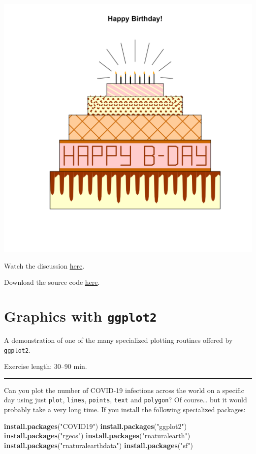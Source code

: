 \documentclass[
]{book}
\newenvironment{Shaded}{\begin{snugshade}}{\end{snugshade}}
\newcommand{\FunctionTok}[1]{\textcolor[rgb]{0.13,0.29,0.53}{\textbf{#1}}}
\newcommand{\NormalTok}[1]{#1}
\newcommand{\StringTok}[1]{\textcolor[rgb]{0.31,0.60,0.02}{#1}}
\begin{document}
\includegraphics[width=28in]{figures/AS2022cake}

Watch the discussion \href{https://youtu.be/ERXp51uHp2w}{here}.

Download the source code \href{files/cake-winner-AS-2021.Rmd}{here}.

\hypertarget{ggplot2}{%
\chapter{\texorpdfstring{Graphics with \texttt{ggplot2}}{Graphics with ggplot2}}\label{ggplot2}}

A demonstration of one of the many specialized plotting routines offered by \texttt{ggplot2}.

Exercise length: 30--90 min.

\begin{center}\rule{0.5\linewidth}{0.5pt}\end{center}

Can you plot the number of COVID-19 infections across the world on a specific day using just \texttt{plot}, \texttt{lines}, \texttt{points}, \texttt{text} and \texttt{polygon}? Of course\ldots{} but it would probably take a very long time. If you install the following specialized packages:

\begin{Shaded}
\begin{Highlighting}[]
\FunctionTok{install.packages}\NormalTok{(}\StringTok{"COVID19"}\NormalTok{)}
\FunctionTok{install.packages}\NormalTok{(}\StringTok{"ggplot2"}\NormalTok{)}
\FunctionTok{install.packages}\NormalTok{(}\StringTok{"rgeos"}\NormalTok{)}
\FunctionTok{install.packages}\NormalTok{(}\StringTok{"rnaturalearth"}\NormalTok{)}
\FunctionTok{install.packages}\NormalTok{(}\StringTok{"rnaturalearthdata"}\NormalTok{)}
\FunctionTok{install.packages}\NormalTok{(}\StringTok{"sf"}\NormalTok{)}
\end{Highlighting}
\end{Shaded}
\end{document}
